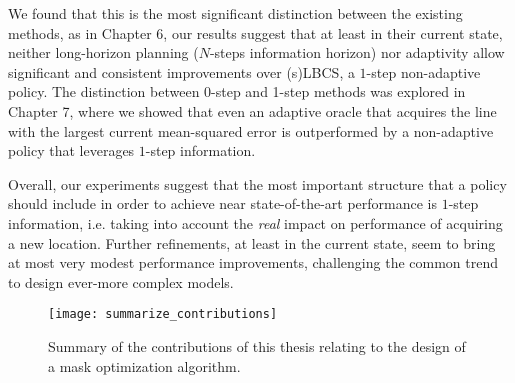 We found that this is the most significant distinction between the existing methods, as in Chapter 6, our results suggest that at least in their current state, neither long-horizon planning ($N$-steps information horizon) nor adaptivity allow significant and consistent improvements over (s)LBCS, a $1$-step non-adaptive policy. The distinction between 0-step and 1-step methods was explored in Chapter 7, where we showed that even an adaptive oracle that acquires the line with the largest current mean-squared error is outperformed by a non-adaptive policy that leverages $1$-step information.

Overall, our experiments suggest that the most important structure that a policy should include in order to achieve near state-of-the-art performance is $1$-step information, i.e. taking into account the \textit{real} impact on performance of acquiring a new location. Further refinements, at least in the current state, seem to bring at most very modest performance improvements, challenging the common trend to design ever-more complex models. 


\begin{figure}[!t]
    \centering
    \texttt{[image: summarize\_contributions]}
    \caption{Summary of the contributions of this thesis relating to the design of a mask optimization algorithm. }\label{fig:summarize_contributions}
\end{figure}
\newpage


